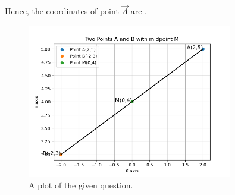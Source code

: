 \documentclass[journal]{IEEEtran}
\begin{document}
Hence, the coordinates of point $\vec{A}$ are  .

\begin{figure}[h] %
    \centering
    \includegraphics[width=0.8\textwidth]{figs/Graph1.png}
	\caption{A plot of the given question.}
    \label{fig:Plot1}
\end{figure}
 
\end{document}
